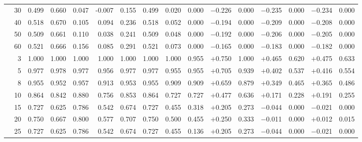\documentclass[conference]{IEEEtran}
\theoremstyle{remark}
\begin{document}
\begin{table}[t]
{\begin{tabular}{p{2.2cm}r rrrr rr rr rr rr rr}
  & 30 & 0.499 & 0.660 & 0.047 & -0.007 & 0.155 & 0.499 & 0.020 & 0.000 & $-$0.226 & 0.000 & $-$0.235 & 0.000 & $-$0.234 & 0.000 \\
  & 40 & 0.518 & 0.670 & 0.105 & 0.094 & 0.236 & 0.518 & 0.052 & 0.000 & $-$0.194 & 0.000 & $-$0.209 & 0.000 & $-$0.208 & 0.000 \\
  & 50 & 0.509 & 0.661 & 0.110 & 0.038 & 0.241 & 0.509 & 0.048 & 0.000 & $-$0.192 & 0.000 & $-$0.206 & 0.000 & $-$0.205 & 0.000 \\
  & 60 & 0.521 & 0.666 & 0.156 & 0.085 & 0.291 & 0.521 & 0.073 & 0.000 & $-$0.165 & 0.000 & $-$0.183 & 0.000 & $-$0.182 & 0.000 \\
\midrule
{}
  & 3  & 1.000 & 1.000 & 1.000 & 1.000 & 1.000 & 1.000 & 1.000 & 0.955 & $+$0.750 & 1.000 & $+$0.465 & 0.620 & $+$0.475 & 0.633 \\
  & 5  & 0.977 & 0.978 & 0.977 & 0.956 & 0.977 & 0.977 & 0.955 & 0.955 & $+$0.705 & 0.939 & $+$0.402 & 0.537 & $+$0.416 & 0.554 \\
  & 8  & 0.955 & 0.952 & 0.957 & 0.913 & 0.953 & 0.955 & 0.909 & 0.909 & $+$0.659 & 0.879 & $+$0.349 & 0.465 & $+$0.365 & 0.486 \\
  & 10 & 0.864 & 0.842 & 0.880 & 0.756 & 0.853 & 0.864 & 0.727 & 0.727 & $+$0.477 & 0.636 & $+$0.171 & 0.228 & $+$0.191 & 0.255 \\
  & 15 & 0.727 & 0.625 & 0.786 & 0.542 & 0.674 & 0.727 & 0.455 & 0.318 & $+$0.205 & 0.273 & $-$0.044 & 0.000 & $-$0.021 & 0.000 \\
  & 20 & 0.750 & 0.667 & 0.800 & 0.577 & 0.707 & 0.750 & 0.500 & 0.455 & $+$0.250 & 0.333 & $-$0.011 & 0.000 & $+$0.012 & 0.015 \\
  & 25 & 0.727 & 0.625 & 0.786 & 0.542 & 0.674 & 0.727 & 0.455 & 0.136 & $+$0.205 & 0.273 & $-$0.044 & 0.000 & $-$0.021 & 0.000 \\

\end{tabular}}
\end{table}
\end{document}
